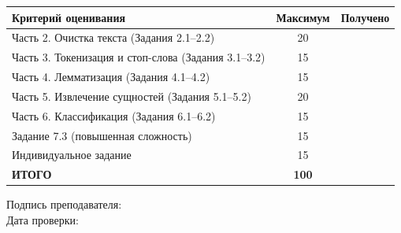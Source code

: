 \documentclass[12pt, a4paper]{report}
\begin{document}
\begin{tcolorbox}[infobox, title={Заполняется преподавателем}]
  \begin{tabularx}{\linewidth}{X c c}
    \toprule
    \rowcolor{LightBlue}
    \textsf{\textbf{Критерий оценивания}} &
    \textsf{\textbf{Максимум}} &
    \textsf{\textbf{Получено}} \\
    \midrule
    Часть 2. Очистка текста (Задания 2.1–2.2)          & 20 & \\
    Часть 3. Токенизация и стоп-слова (Задания 3.1–3.2) & 15 & \\
    Часть 4. Лемматизация (Задания 4.1–4.2)             & 15 & \\
    Часть 5. Извлечение сущностей (Задания 5.1–5.2)     & 20 & \\
    Часть 6. Классификация (Задания 6.1–6.2)            & 15 & \\
    Задание 7.3 (повышенная сложность)                  & 15 & \\
    Индивидуальное задание                              & 15 & \\
    \midrule
    \textbf{ИТОГО}                                      & \textbf{100} & \\
    \bottomrule
  \end{tabularx}
\end{tcolorbox}

\vspace{24pt}
\noindent Подпись преподавателя: \underline{\hspace{6cm}}
\\[12pt]
\noindent Дата проверки: \underline{\hspace{4cm}}
\end{document}
